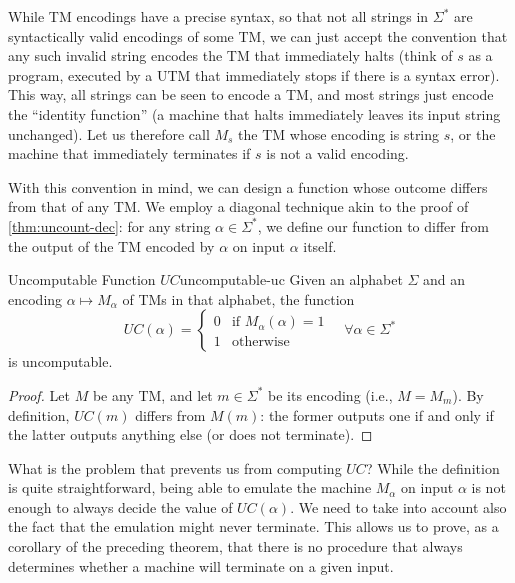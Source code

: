 While TM encodings have a precise syntax, so that not all strings in \(\Sigma^*\) are syntactically valid encodings of some TM, we can just accept the convention that any such invalid string encodes the TM that immediately halts (think of \(s\) as a program, executed by a UTM that immediately stops if there is a syntax error). This way, all strings can be seen to encode a TM, and most strings just encode the ``identity function'' (a machine that halts immediately leaves its input string unchanged). Let us therefore call \(M_s\) the TM whose encoding is string \(s\), or the machine that immediately terminates if \(s\) is not a valid encoding.

With this convention in mind, we can design a function whose outcome differs from that of any TM. We employ a diagonal technique akin to the proof of \cref{thm:uncount-dec}: for any string \(\alpha \in \Sigma^*\), we define our function to differ from the output of the TM encoded by \(\alpha\) on input \(\alpha\) itself.

\begin{theorem}{Uncomputable Function \(UC\)}{uncomputable-uc}
    Given an alphabet \(\Sigma\) and an encoding \(\alpha \mapsto M_\alpha\) of TMs in that alphabet, the function
    \[
    UC(\alpha) =
    \begin{cases}
        0 & \text{if } M_\alpha(\alpha) = 1 \\
        1 & \text{otherwise}
    \end{cases}
    \quad \forall \alpha \in \Sigma^*
    \]
    is uncomputable.
    \begin{proof}
        Let \(M\) be any TM, and let \(m \in \Sigma^*\) be its encoding (i.e., \(M = M_m\)). By definition, \(UC(m)\) differs from \(M(m)\): the former outputs one if and only if the latter outputs anything else (or does not terminate).
    \end{proof}
\end{theorem}

\noindent What is the problem that prevents us from computing \(UC\)? While the definition is quite straightforward, being able to emulate the machine \(M_\alpha\) on input \(\alpha\) is not enough to always decide the value of \(UC(\alpha)\). We need to take into account also the fact that the emulation might never terminate. This allows us to prove, as a corollary of the preceding theorem, that there is no procedure that always determines whether a machine will terminate on a given input.

